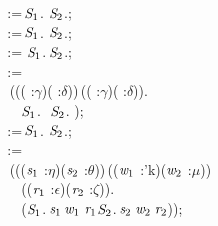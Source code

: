\,\,\,\,\,\,\,\,\,\,:=\,\ensuremath{\HOLFreeVar{S}\sb{\mathrm{1}}}.\,\HOLSymConst{\ensuremath{\times}}\,\ensuremath{\HOLFreeVar{S}\sb{\mathrm{2}}}.;\\
\,\,\,\,\,\,\,\,\,\,:=\,\ensuremath{\HOLFreeVar{S}\sb{\mathrm{1}}}.\,\HOLSymConst{\ensuremath{\times}}\,\ensuremath{\HOLFreeVar{S}\sb{\mathrm{2}}}.;\\
\,\,\,\,\,\,\,\,\,\,:=\,\,\ensuremath{\HOLFreeVar{S}\sb{\mathrm{1}}}.\,\ensuremath{\HOLFreeVar{S}\sb{\mathrm{2}}}.;\\
\,\,\,\,\,\,\,\,\,\,:=\\
\,\,\,\,\,\,\,\,\,\,\,(\HOLTokenLambda{}(( :\ensuremath{\gamma})\HOLSymConst{,}( :\ensuremath{\delta}))\,(( :\ensuremath{\gamma})\HOLSymConst{,}( :\ensuremath{\delta})).\\
\,\,\,\,\,\,\,\,\,\,\,\,\,\,\,\,\ensuremath{\HOLFreeVar{S}\sb{\mathrm{1}}}.\,\,\,\HOLSymConst{\HOLTokenConj{}}\,\ensuremath{\HOLFreeVar{S}\sb{\mathrm{2}}}.\,\,);\\
\,\,\,\,\,\,\,\,\,\,:=\,\ensuremath{\HOLFreeVar{S}\sb{\mathrm{1}}}.\,\HOLSymConst{\ensuremath{\times}}\,\ensuremath{\HOLFreeVar{S}\sb{\mathrm{2}}}.;\\
\,\,\,\,\,\,\,\,\,\,:=\\
\,\,\,\,\,\,\,\,\,\,\,(\HOLTokenLambda{}((\ensuremath{\HOLBoundVar{s}\sb{\mathrm{1}}} :\ensuremath{\eta})\HOLSymConst{,}(\ensuremath{\HOLBoundVar{s}\sb{\mathrm{2}}} :\ensuremath{\theta}))\,((\ensuremath{\HOLBoundVar{w}\sb{\mathrm{1}}} :'k)\HOLSymConst{,}(\ensuremath{\HOLBoundVar{w}\sb{\mathrm{2}}} :\ensuremath{\mu}))\\
\,\,\,\,\,\,\,\,\,\,\,\,\,\,\,\,((\ensuremath{\HOLBoundVar{r}\sb{\mathrm{1}}} :\ensuremath{\epsilon})\HOLSymConst{,}(\ensuremath{\HOLBoundVar{r}\sb{\mathrm{2}}} :\ensuremath{\zeta})).\\
\,\,\,\,\,\,\,\,\,\,\,\,\,\,\,\,(\ensuremath{\HOLFreeVar{S}\sb{\mathrm{1}}}.\,\ensuremath{\HOLBoundVar{s}\sb{\mathrm{1}}}\,\ensuremath{\HOLBoundVar{w}\sb{\mathrm{1}}}\,\ensuremath{\HOLBoundVar{r}\sb{\mathrm{1}}}\HOLSymConst{,}\ensuremath{\HOLFreeVar{S}\sb{\mathrm{2}}}.\,\ensuremath{\HOLBoundVar{s}\sb{\mathrm{2}}}\,\ensuremath{\HOLBoundVar{w}\sb{\mathrm{2}}}\,\ensuremath{\HOLBoundVar{r}\sb{\mathrm{2}}}));\\
